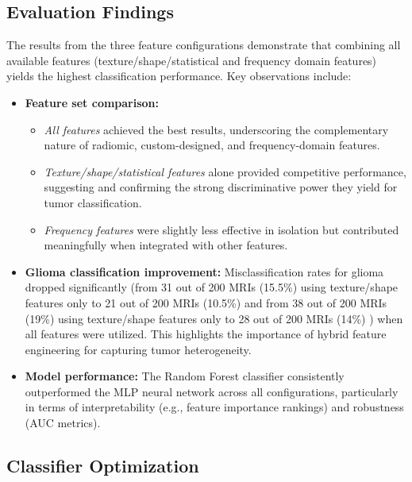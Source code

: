 \documentclass[11pt,a4paper]{article}
\begin{document}
\subsection{Evaluation Findings}

The results from the three feature configurations demonstrate that combining all available 
features (texture/shape/statistical and frequency domain features) yields the highest 
classification performance. Key observations include:

\begin{itemize}
    \item \textbf{Feature set comparison:}

    \begin{itemize}
        \item \textit{All features} achieved the best results, underscoring the complementary nature of radiomic, custom-designed, 
		and frequency-domain features.
        \item \textit{Texture/shape/statistical features} alone provided competitive performance, 
		suggesting and confirming the strong discriminative power they yield for tumor classification.
        \item \textit{Frequency features} were slightly less effective in isolation 
		but contributed meaningfully when integrated with other features.
    \end{itemize}
    
    \item \textbf{Glioma classification improvement:}
	    Misclassification rates for glioma dropped significantly (from 31 out of 200 MRIs (15.5\%) using texture/shape features 
		only to 21 out of 200 MRIs (10.5\%)  and from 38 out of 200 MRIs (19\%) using texture/shape features 
		only to 28 out of 200 MRIs (14\%)  )
		when all features were utilized. This highlights the importance of hybrid feature engineering for capturing tumor heterogeneity.
    
    \item \textbf{Model performance:}
		The Random Forest classifier consistently outperformed the MLP neural network across all configurations, 
		particularly in terms of interpretability (e.g., feature importance rankings) and robustness (AUC metrics).
\end{itemize}




		\subsection{Classifier Optimization}
\end{document}
